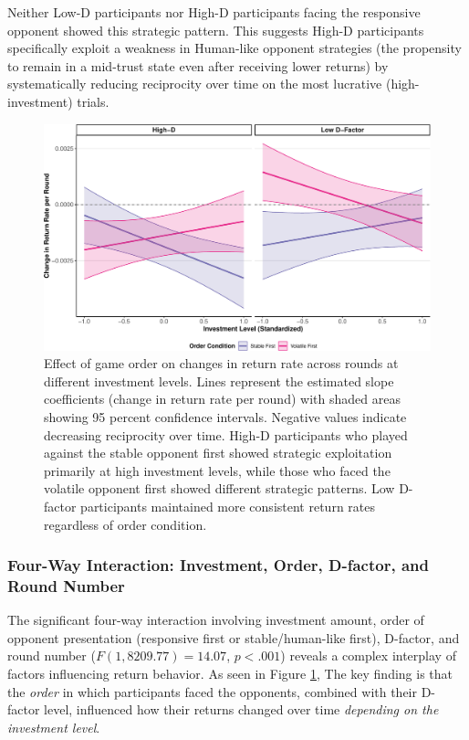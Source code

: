 \documentclass[
]{article}
\begin{document}
Neither Low-D participants nor High-D participants facing the responsive opponent showed this strategic pattern. This suggests High-D participants specifically exploit a weakness in Human-like opponent strategies (the propensity to remain in a mid-trust state even after receiving lower returns) by systematically reducing reciprocity over time on the most lucrative (high-investment) trials.

\begin{figure}[H]

{\centering \includegraphics{article_files/figure-latex/orderEffectPlot-1} 

}

\caption{Effect of game order on changes in return rate across rounds at different investment levels. Lines represent the estimated slope coefficients (change in return rate per round) with shaded areas showing 95 percent confidence intervals. Negative values indicate decreasing reciprocity over time. High-D participants who played against the stable opponent first showed strategic exploitation primarily at high investment levels, while those who faced the volatile opponent first showed different strategic patterns. Low D-factor participants maintained more consistent return rates regardless of order condition.}\label{fig:orderEffectPlot}
\end{figure}

\subsubsection{Four-Way Interaction: Investment, Order, D-factor, and Round Number}\label{four-way-interaction-investment-order-d-factor-and-round-number}

The significant four-way interaction involving investment amount, order of opponent presentation (responsive first or stable/human-like first), D-factor, and round number (\(F(1, 8209.77) = 14.07\), \(p < .001\)) reveals a complex interplay of factors influencing return behavior. As seen in Figure \ref{fig:orderEffectPlot}, The key finding is that the \emph{order} in which participants faced the opponents, combined with their D-factor level, influenced how their returns changed over time \emph{depending on the investment level}.
\end{document}
